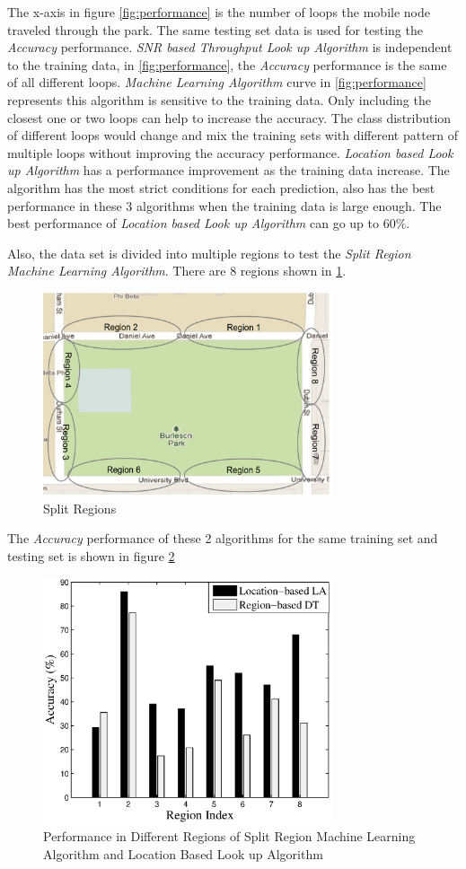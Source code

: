 The x-axis in figure \ref{fig:performance} is the number of loops the mobile node traveled through the park. 
The same testing set data is used for testing the \emph{Accuracy} performance.
\emph{SNR based Throughput Look up Algorithm} is independent to the training data, in \ref{fig:performance}, the \emph{Accuracy} performance is the same of all different loops.
\emph{Machine Learning Algorithm} curve in \ref{fig:performance} represents this algorithm is sensitive to the training data.
Only including the closest one or two loops can help to increase the accuracy. The class distribution of different loops would change and mix the training sets with different pattern of multiple loops without improving the accuracy performance.
\emph{Location based Look up Algorithm} has a performance improvement as the training data increase. The algorithm has the most strict conditions for each prediction, also has the best performance in these 3 algorithms when the training data is large enough.
The best performance of \emph{Location based Look up Algorithm} can go up to 60\%.


Also, the data set is divided into multiple regions to test the \emph{Split Region Machine Learning Algorithm}. There are 8 regions shown in \ref{fig:region map}.

\begin{figure}
\centering
\includegraphics[width=85mm]{figure/region_map}
\caption{Split Regions}
\label{fig:region map}
\end{figure}

The \emph{Accuracy} performance of these 2 algorithms for the same training set and testing set is shown in figure \ref{fig:mvsl}

 
\begin{figure}
\centering
\includegraphics[width=85mm]{figure/mvsl}
\caption{Performance in Different Regions of Split Region Machine Learning Algorithm and Location Based Look up Algorithm}
\label{fig:mvsl}
\end{figure}

